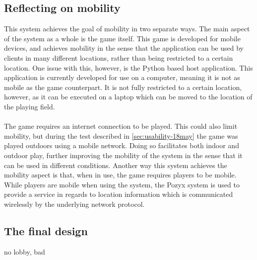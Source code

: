 \subsection{Reflecting on mobility}
This system achieves the goal of mobility in two separate ways.
The main aspect of the system as a whole is the game itself.
This game is developed for mobile devices, and achieves mobility in the sense that the application can be used by clients in many different locations, rather than being restricted to a certain location.
One issue with this, however, is the Python based host application.
This application is currently developed for use on a computer, meaning it is not as mobile as the game counterpart.
It is not fully restricted to a certain location, however, as it can be executed on a laptop which can be moved to the location of the playing field.
\\\\
The game requires an internet connection to be played.
This could also limit mobility, but during the test described in \autoref{sec:usability-18may} the game was played outdoors using a mobile network.
Doing so facilitates both indoor and outdoor play, further improving the mobility of the system in the sense that it can be used in different conditions.
Another way this system achieves the mobility aspect is that, when in use, the game requires players to be mobile.
While players are mobile when using the system, the Pozyx system is used to provide a service in regards to location information which is communicated wirelessly by the underlying network protocol.

\subsection{The final design}
no lobby, bad

